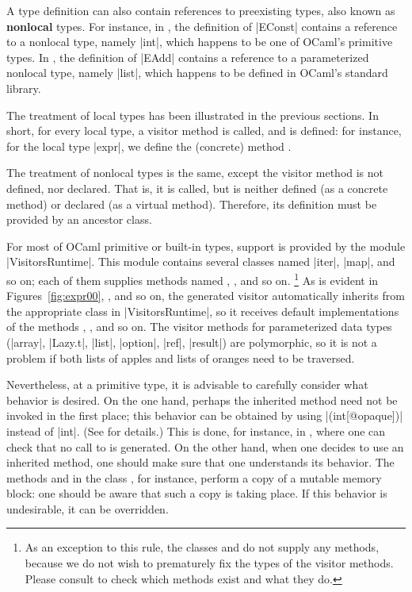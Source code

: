 \documentclass[11pt,a4paper,twoside]{article}
\renewcommand{\emph}[1]{\textbf{#1}}
\begin{document}
A type definition can also contain references to preexisting types, also
known as \emph{nonlocal} types. For instance, in , the
definition of \oc|EConst| contains a reference to a nonlocal type, namely
\oc|int|, which happens to be one of OCaml's primitive types. In
, the definition of \oc|EAdd| contains a reference to a
parameterized nonlocal type, namely \oc|list|, which happens to be defined in
OCaml's standard library.

The treatment of local types has been illustrated in the previous sections. In
short, for every local type, a visitor method is called, and is defined:
for instance, for the local type \oc|expr|, we define the (concrete) method
.

The treatment of nonlocal types is the same, except the visitor method is not
defined, nor declared. That is, it is called, but is neither defined (as a
concrete method) or declared (as a virtual method). Therefore, its definition
must be provided by an ancestor class.

For most of OCaml primitive or built-in types, support is provided by the
module \oc|VisitorsRuntime|. This module contains several classes named
\oc|iter|, \oc|map|, and so on; each of them supplies methods named
, , and so on.%
%
\footnote{As an exception to this rule, the classes 
  and  do not supply any methods, because we do not
  wish to prematurely fix the types of the visitor methods. Please consult
   to check which methods exist and what they
  do.} %
%
As is evident in Figures~\ref{fig:expr00}, , and so on, the
generated visitor automatically inherits from the appropriate class in
\oc|VisitorsRuntime|, so it receives default implementations of the methods
, , and so on. The visitor methods for
parameterized data types (\oc|array|, \oc|Lazy.t|, \oc|list|, \oc|option|,
\oc|ref|, \oc|result|) are polymorphic, so it is not a problem if both lists
of apples and lists of oranges need to be traversed.

Nevertheless, at a primitive type, it is advisable to carefully consider what
behavior is desired. On the one hand, perhaps the inherited method
 need not be invoked in the first place; this behavior can
be obtained by using \oc|(int[@opaque])| instead of \oc|int|. (See
 for details.) This is done, for instance, in
, where one can check that no call to  is
generated. On the other hand, when one decides to use an inherited method, one
should make sure that one understands its behavior. The methods
 and  in the class
, for instance, perform a copy of a mutable memory
block: one should be aware that such a copy is taking place. If this behavior
is undesirable, it can be overridden.
\end{document}

